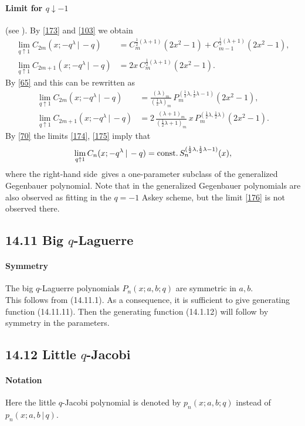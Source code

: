 \documentclass[twoside,11pt]{article}
\newcommand\sa{\smallskipamount}
\newcommand\sLP{\\[\sa]}
\newcommand\la\lambda
\newcommand\half{\frac12}
\newcommand\const{{\rm const.}\,}
\newcommand\RHS{right-hand side}
\begin{document}
\paragraph{Limit for $q\downarrow-1$}
(see ).
By \eqref{173} and \eqref{103} we obtain
\begin{align*}
\lim_{q\uparrow1} C_{2m}(x;-q^\la\,|\,-q)&=
C_m^{\half(\la+1)}(2x^2-1)+C_{m-1}^{\half(\la+1)}(2x^2-1),\\
\lim_{q\uparrow1} C_{2m+1}(x;-q^\la\,|\,-q)&=
2x\,C_m^{\half(\la+1)}(2x^2-1).
\end{align*}
By \eqref{65} and  this can be rewritten as
\begin{align}
\lim_{q\uparrow1} C_{2m}(x;-q^\la\,|\,-q)&=
\frac{(\la)_m}{(\half\la)_m}\, P_m^{(\half\la,\half\la-1)}(2x^2-1),
\label{174}\\
\lim_{q\uparrow1} C_{2m+1}(x;-q^\la\,|\,-q)&=
2\,\frac{(\la+1)_m}{(\half\la+1)_m}\,x\,P_m^{(\half\la,\half\la)}(2x^2-1).
\label{175}
\end{align}
By \eqref{70} the limits \eqref{174}, \eqref{175} imply that
\begin{equation}
\lim_{q\uparrow1} C_n(x;-q^\la\,|\,-q)
=\const S_n^{(\half\la,\half\la-1)}(x),
\label{176}
\end{equation}
where the \RHS\ gives a one-parameter subclass of the
generalized Gegenbauer polynomial. Note that in
\cite[Section 7.1]{K28} the generalized Gegenbauer polynomials are
also observed as fitting in the $q=-1$ Askey scheme, but the limit
\eqref{176} is not observed there.
%
\subsection*{14.11 Big $q$-Laguerre}
\label{sec14.11}
%
\paragraph{Symmetry}
The big $q$-Laguerre polynomials $P_n(x;a,b;q)$ are symmetric in $a,b$.
\sLP
This follows from (14.11.1).
As a consequence, it is sufficient to give generating function (14.11.11). Then the generating
function (14.1.12) will follow by symmetry in the parameters.
%
\subsection*{14.12 Little $q$-Jacobi}
\label{sec14.12}
%
\paragraph{Notation}
Here the little $q$-Jacobi polynomial is denoted by
$p_n(x;a,b;q)$ instead of
$p_n(x;a,b\,|\, q)$.
%
\end{document}

